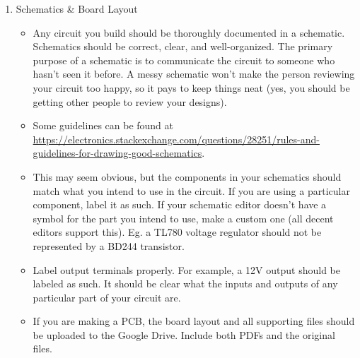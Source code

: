 \documentclass{article}
\begin{document}
\begin{enumerate}
\item Schematics \& Board Layout
\begin{itemize}
\item Any circuit you build should be thoroughly documented in a schematic. Schematics should be correct, clear, and well-organized. The primary purpose of a schematic is to communicate the circuit to someone who hasn't seen it before. A messy schematic won't make the person reviewing your circuit too happy, so it pays to keep things neat (yes, you should be getting other people to review your designs). 
\item Some guidelines can be found at \url{https://electronics.stackexchange.com/questions/28251/rules-and-guidelines-for-drawing-good-schematics}.
\item This may seem obvious, but the components in your schematics should match what you intend to use in the circuit. If you are using a particular component, label it as such. If your schematic editor doesn't have a symbol for the part you intend to use, make a custom one (all decent editors support this). Eg. a TL780 voltage regulator should not be represented by a BD244 transistor.
\item Label output terminals properly. For example, a 12V output should be labeled as such. It should be clear what the inputs and outputs of any particular part of your circuit are.
\item If you are making a PCB, the board layout and all supporting files should be uploaded to the Google Drive. Include both PDFs and the original files.
\end{itemize}
\end{enumerate}

\end{document}
